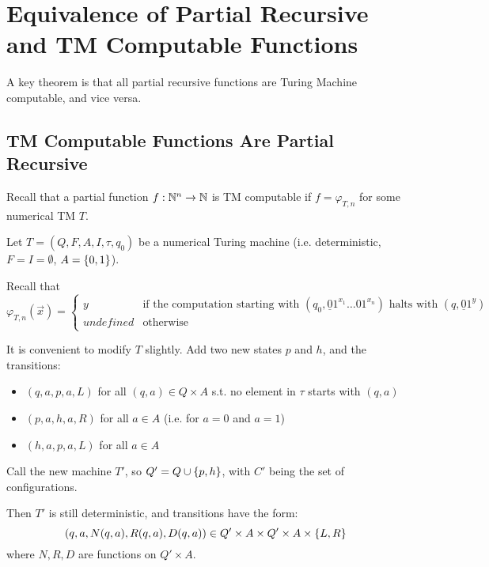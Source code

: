 \section{Equivalence of Partial Recursive and TM Computable \mbox{Functions}}

A key theorem is that all partial recursive functions are Turing Machine computable, and vice versa.

\subsection{TM Computable Functions Are Partial Recursive}

Recall that a partial function $ f: \mathbb{N}^n \to \mathbb{N} $ is TM computable if $ f = \varphi_{T, n} $ for some numerical TM $ T $.

Let $ T = (Q, F, A, I, \tau, q_0) $ be a numerical Turing machine (i.e. deterministic, $ F = I = \emptyset $, $ A = \left\lbrace 0, 1 \right\rbrace $).

Recall that $ \varphi_{T, n}(\vec{x}) = \begin{cases}
y &\text{if the computation starting with } (q_0, \underline{0}1^{x_1} \dots 01^{x_n}) \text{ halts with } (q, \underline{0}1^y)\\
\textit{undefined} &\text{otherwise}
\end{cases} $

It is convenient to modify $ T $ slightly. Add two new states $ p $ and $ h $, and the transitions:

\begin{itemize}
	
	\item $ (q, a, p, a, L) $ for all $ (q, a) \in Q \times A $ s.t. no element in $ \tau $ starts with $ (q, a) $
	
	\item $ (p, a, h, a, R) $ for all $ a \in A $ (i.e. for $ a = 0 $ and $ a = 1 $)
	
	\item $ (h, a, p, a, L) $ for all $ a \in A $
	
\end{itemize}

Call the new machine $ T' $, so $ Q' = Q \cup \left\lbrace p, h \right\rbrace $, with $ C' $ being the set of configurations.

Then $ T' $ is still deterministic, and transitions have the form:
\begin{equation*}
(q, a, N(q, a), R(q, a), D(q, a)) \in Q' \times A \times Q' \times A \times \left\lbrace L, R \right\rbrace
\end{equation*}
where $ N, R, D $ are functions on $ Q' \times A $.

